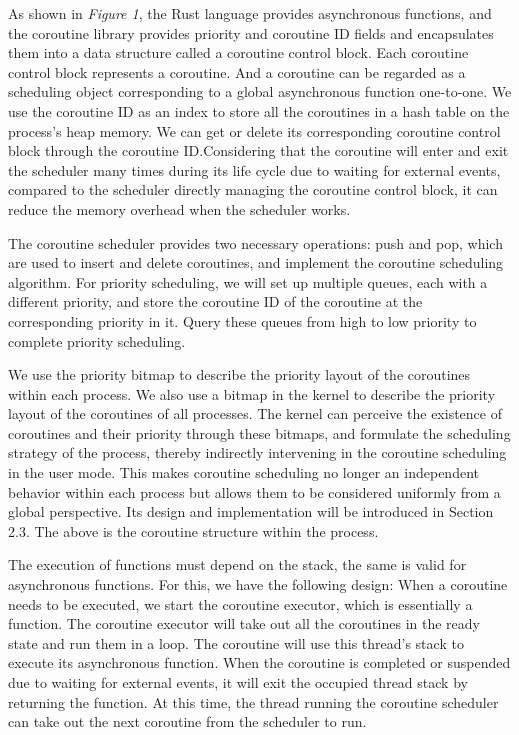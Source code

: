 \documentclass[10pt]{article}
\begin{document}
As shown in \textit{Figure 1}, the Rust language provides asynchronous functions, and the coroutine library provides priority and coroutine ID fields and encapsulates them into a data structure called a coroutine control block. Each coroutine control block represents a coroutine. And a coroutine can be regarded as a scheduling object corresponding to a global asynchronous function one-to-one. We use the coroutine ID as an index to store all the coroutines in a hash table on the process's heap memory. We can get or delete its corresponding coroutine control block through the coroutine ID.Considering that the coroutine will enter and exit the scheduler many times during its life cycle due to waiting for external events, compared to the scheduler directly managing the coroutine control block, it can reduce the memory overhead when the scheduler works. 

The coroutine scheduler provides two necessary operations: push and pop, which are used to insert and delete coroutines, and implement the coroutine scheduling algorithm. For priority scheduling, we will set up multiple queues, each with a different priority, and store the coroutine ID of the coroutine at the corresponding priority in it. Query these queues from high to low priority to complete priority scheduling. 

We use the priority bitmap to describe the priority layout of the coroutines within each process. We also use a bitmap in the kernel to describe the priority layout of the coroutines of all processes. The kernel can perceive the existence of coroutines and their priority through these bitmaps, and formulate the scheduling strategy of the process, thereby indirectly intervening in the coroutine scheduling in the user mode. This makes coroutine scheduling no longer an independent behavior within each process but allows them to be considered uniformly from a global perspective. Its design and implementation will be introduced in Section 2.3. The above is the coroutine structure within the process.

The execution of functions must depend on the stack, the same is valid for asynchronous functions. For this, we have the following design: When a coroutine needs to be executed, we start the coroutine executor, which is essentially a function. The coroutine executor will take out all the coroutines in the ready state and run them in a loop. The coroutine will use this thread's stack to execute its asynchronous function. When the coroutine is completed or suspended due to waiting for external events, it will exit the occupied thread stack by returning the function. At this time, the thread running the coroutine scheduler can take out the next coroutine from the scheduler to run.
\end{document}
